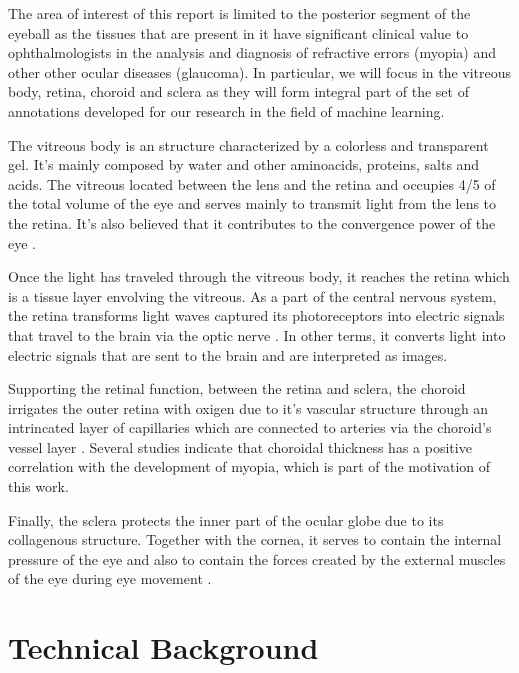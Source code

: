 \documentclass[12pt,a4paper]{scrartcl}
\begin{document}
The area of interest of this report is limited to the posterior segment of the eyeball as the tissues that are present in it have significant clinical value to ophthalmologists in the analysis and diagnosis of refractive errors (myopia) and other other ocular diseases (glaucoma)\cite{Ronchetti2017}. In particular, we will focus in the vitreous body, retina, choroid and sclera as they will form integral part of the set of annotations developed for our research in the field of machine learning. 

The vitreous body is an structure characterized by a colorless and transparent gel. It's mainly composed by water and other aminoacids, proteins, salts and acids. The vitreous located between the lens and the retina and occupies 4/5 of the total volume of the eye and serves mainly to transmit light from the lens to the retina. It's also believed that it contributes to the convergence power of the eye \cite{snell1998}. 

Once the light has traveled through the vitreous body, it reaches the retina which is a tissue layer envolving the vitreous. As a part of the central nervous system, the retina transforms light waves captured its photoreceptors into electric signals that travel to the brain via the optic nerve \cite{purves2001}. In other terms, it converts light into electric signals that are sent to the brain and are interpreted as images.

Supporting the retinal function, between the retina and sclera, the choroid irrigates the outer retina with oxigen due to it's vascular structure through an intrincated layer of capillaries which are connected to arteries via the choroid's vessel layer \cite{snell1998, choroidExpl}. Several studies \cite{Ronchetti2019, Ronchetti2018} indicate that choroidal thickness has a positive correlation with the development of myopia, which is part of the motivation of this work. 

Finally, the sclera protects the inner part of the ocular globe due to its collagenous structure. Together with the cornea, it serves to contain the internal pressure of the eye and also to contain the forces created by the external muscles of the eye during eye movement \cite{Meek2008}.

\section{Technical Background}\label{s:TechBack}
\end{document}
